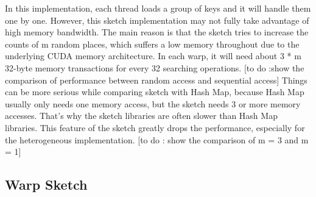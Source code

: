 \documentclass[conference]{IEEEtran}
\begin{document}

In this implementation, each thread loads a group of keys and it will handle them one by one. However, this sketch implementation may not fully take advantage of high memory bandwidth. The main reason is that the sketch tries to increase the counts of m random places, which suffers a low memory throughout due to the underlying CUDA memory architecture. In each warp, it will need about 3 * m 32-byte memory transactions for every 32 searching operations. 
[to do :show the comparison of performance between random access and sequential access]
Things can be more serious while comparing sketch with Hash Map, because Hash Map usually only needs one memory access, but the sketch needs 3 or more memory accesses. That's why the sketch libraries are often slower than Hash Map libraries. This feature of the sketch greatly drops the performance, especially for the heterogeneous implementation. [to do : show the comparison of m = 3 and m = 1]
\subsection{Warp Sketch}
\end{document}
